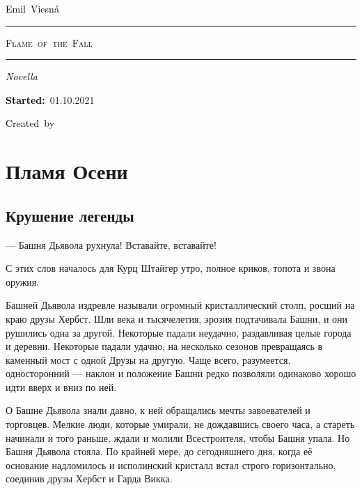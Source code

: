 \documentclass[a4paper,10pt,fleqn]{book}\usepackage{polyglossia}\setdefaultlanguage{english}\setotherlanguage{russian}\defaultfontfeatures{Ligatures=TeX,Mapping=tex-text}\usepackage{xcolor}\definecolor{lightgray}{HTML}{bbbbbb}\color{lightgray}\newcommand{\ml}[3]{\textcolor{black}{#3}}
\newcommand{\tofaauthor}{\ml{$0$}{Эмиль~Весна}{Emil~Viesn\'{a}}}
\newcommand{\tofatitle}{\ml{$0$}{ПЛАМЯ~ОСЕНИ}{Flame~of~the~Fall}}
\newcommand{\tofastarted}{01.10.2021}
\newcommand{\asterism}{\vspace{1em}{\centering\Large\bfseries$\ast~\ast~\ast$\par}\vspace{1em}}
\begin{document}

\begin{titlepage}
{\centering{~\par}\vspace{0.25\textheight}
{\LARGE\tofaauthor}\par
\vspace{1.0cm}\rule{17em}{1pt}\par\vspace{0.3cm}
{\Huge\textsc{\tofatitle}\par}
\vspace{0.3cm}\rule{17em}{2pt}\par\vspace{1.0cm}
{\Large\textit{\ml{$0$}{Повесть}{Novella}}\par}
\vspace{0.5cm}\asterism\par\vspace{1.0cm}
{\textbf{\ml{$0$}{Начато:}{Started:}}~\tofastarted\par}\vfill
{\Large\ml{$0$}{Создано~в}{Created~by}~\XeLaTeX}\par}
\end{titlepage}

\tableofcontents

\chapter{Пламя Осени}

\section{Крушение легенды}

--- Башня Дьявола рухнула!
Вставайте, вставайте!

С этих слов началось для Курц Штайгер утро, полное криков, топота и звона оружия.

Башней Дьявола издревле называли огромный кристаллический столп, росший на краю друзы Хербст.
Шли века и тысячелетия, эрозия подтачивала Башни, и они рушились одна за другой.
Некоторые падали неудачно, раздавливая целые города и деревни.
Некоторые падали удачно, на несколько сезонов превращаясь в каменный мост с одной Друзы на другую.
Чаще всего, разумеется, односторонний --- наклон и положение Башни редко позволяли одинаково хорошо идти вверх и вниз по ней.

О Башне Дьявола знали давно, к ней обращались мечты завоевателей и торговцев.
Мелкие люди, которые умирали, не дождавшись своего часа, а стареть начинали и того раньше, ждали и молили Всестроителя, чтобы Башня упала.
Но Башня Дьявола стояла.
По крайней мере, до сегодняшнего дня, когда её основание надломилось и исполинский кристалл встал строго горизонтально, соединив друзы Хербст и Гарда Викка.
\end{document}
